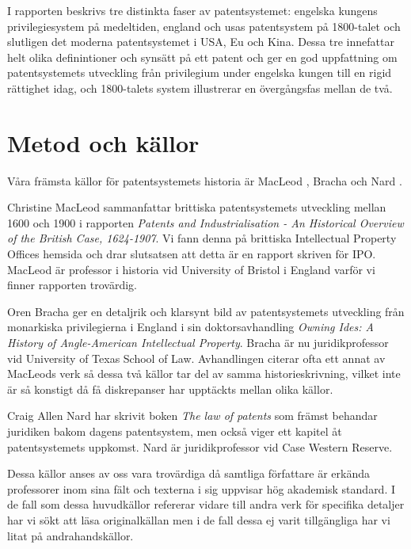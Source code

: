  I rapporten beskrivs tre distinkta faser av patentsystemet: engelska kungens privilegiesystem på medeltiden, england och usas patentsystem på 1800-talet och slutligen det moderna patentsystemet i USA, Eu och Kina. Dessa tre innefattar helt olika definintioner och synsätt på ett patent och ger en god uppfattning om patentsystemets utveckling från privilegium under engelska kungen till en rigid rättighet idag, och 1800-talets system illustrerar en övergångsfas mellan de två.
 

\section{Metod och källor}

Våra främsta källor för patentsystemets historia är MacLeod \cite{macleod},
Bracha \cite{bracha} och Nard \cite{nard}.

Christine MacLeod sammanfattar brittiska patentsystemets utveckling mellan 
1600 och 1900 i rapporten \emph{Patents and Industrialisation - An Historical 
Overview of the British Case, 1624-1907}. Vi fann denna på brittiska 
Intellectual Property Offices hemsida och drar slutsatsen att detta är en 
rapport skriven för IPO. MacLeod är professor i historia vid University of 
Bristol i England varför vi finner rapporten trovärdig.

Oren Bracha ger en detaljrik och klarsynt bild av patentsystemets utveckling 
från monarkiska privilegierna i England i sin doktorsavhandling \emph{Owning 
Ides: A History of Angle-American Intellectual Property}. Bracha är nu 
juridikprofessor vid University of Texas School of Law. Avhandlingen citerar 
ofta ett annat av MacLeods verk så dessa två källor tar del av samma 
historieskrivning, vilket inte är så konstigt då få diskrepanser har upptäckts 
mellan olika källor.

Craig Allen Nard har skrivit boken \emph{The law of patents} som främst 
behandar juridiken bakom dagens patentsystem, men också viger ett kapitel åt 
patentsystemets uppkomst. Nard är juridikprofessor vid Case Western Reserve.

Dessa källor anses av oss vara trovärdiga då samtliga författare är erkända 
professorer inom sina fält och texterna i sig uppvisar hög akademisk standard. 
I de fall som dessa huvudkällor refererar vidare till andra verk för 
specifika detaljer har vi sökt att läsa originalkällan men i de fall dessa ej 
varit tillgängliga har vi litat på andrahandskällor.


